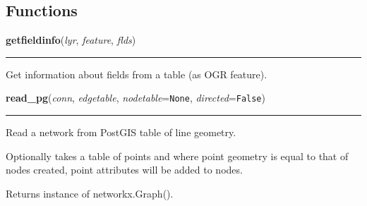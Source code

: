 
  \subsection{Functions}

    \label{nx_pg:getfieldinfo}

    \vspace{0.5ex}

\hspace{.8\funcindent}\begin{boxedminipage}{\funcwidth}

    \raggedright \textbf{getfieldinfo}(\textit{lyr}, \textit{feature}, \textit{flds})

    \vspace{-1.5ex}

    \rule{\textwidth}{0.5\fboxrule}
\setlength{\parskip}{2ex}
    Get information about fields from a table (as OGR feature).

\setlength{\parskip}{1ex}
    \end{boxedminipage}

    \label{nx_pg:read_pg}

    \vspace{0.5ex}

\hspace{.8\funcindent}\begin{boxedminipage}{\funcwidth}

    \raggedright \textbf{read\_pg}(\textit{conn}, \textit{edgetable}, \textit{nodetable}={\tt None}, \textit{directed}={\tt False})

    \vspace{-1.5ex}

    \rule{\textwidth}{0.5\fboxrule}
\setlength{\parskip}{2ex}
    Read a network from PostGIS table of line geometry.

    Optionally takes a table of points and where point geometry is equal to
    that of nodes created, point attributes will be added to nodes.

    Returns instance of networkx.Graph().

\setlength{\parskip}{1ex}
    \end{boxedminipage}

